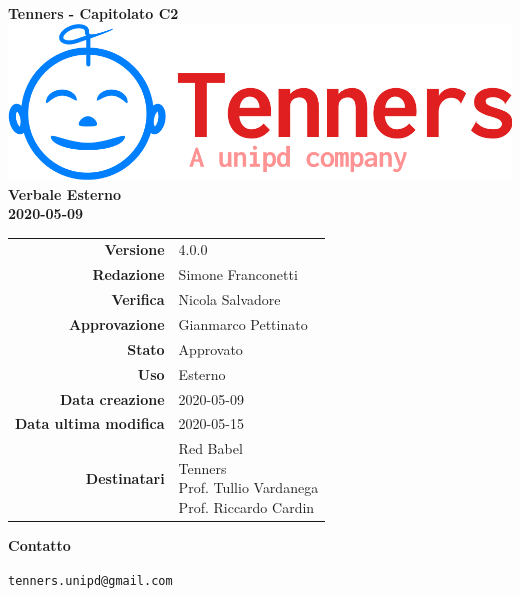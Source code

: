 \begin{titlepage}
	\begin{center}
		\large \textbf{Tenners - Capitolato C2}
		\vfill
		\includegraphics[scale = 0.3]{./res/img/logo.png}\\
		\vfill
		\Huge \textbf{Verbale Esterno} \\
		\textbf {2020-05-09}

        \vfill
        \large

        \begin{tabular}{r|l}
        	\textbf{Versione} & 4.0.0 \\
        	\textbf{Redazione} & Simone Franconetti \\
        	\textbf{Verifica} &  Nicola Salvadore \\
        	\textbf{Approvazione} & Gianmarco Pettinato \\
        	\textbf{Stato} & Approvato \\
        	\textbf{Uso} &  Esterno\\
        	\textbf{Data creazione} &  2020-05-09\\
        	\textbf{Data ultima modifica} & 2020-05-15 \\
        	\textbf{Destinatari} & \parbox[t]{5cm}{Red Babel\\Tenners \\ Prof. Tullio Vardanega\\ Prof. Riccardo Cardin}
        \end{tabular}
    	\vfill
    	\normalsize
    	\vfill
    	\textbf{Contatto}

    	\texttt{tenners.unipd@gmail.com}

	\end{center}
\end{titlepage}
